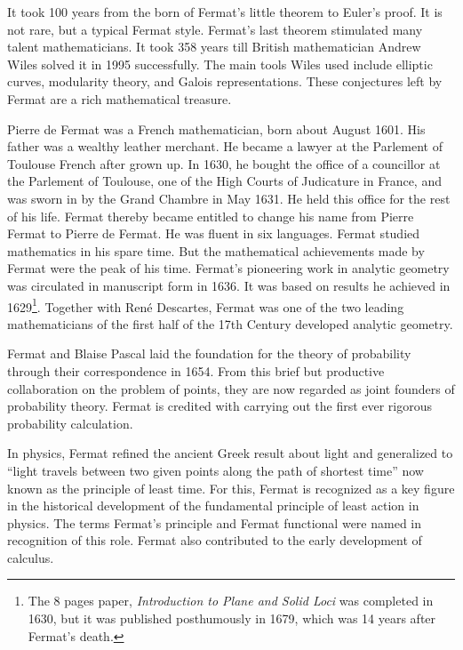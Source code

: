\documentclass[b5paper]{article}
\begin{document}
It took 100 years from the born of Fermat's little theorem to Euler's proof. It is not rare, but a typical Fermat style. Fermat's last theorem stimulated many talent mathematicians. It took 358 years till British mathematician Andrew Wiles solved it in 1995 successfully. The main tools Wiles used include elliptic curves, modularity theory, and Galois representations\cite{HanXueTao2009}. These conjectures left by Fermat are a rich mathematical treasure.

\vspace{5mm}


Pierre de Fermat was a French mathematician, born about August 1601. His father was a wealthy leather merchant. He became a lawyer at the Parlement of Toulouse French after grown up. In 1630, he bought the office of a councillor at the Parlement of Toulouse, one of the High Courts of Judicature in France, and was sworn in by the Grand Chambre in May 1631. He held this office for the rest of his life. Fermat thereby became entitled to change his name from Pierre Fermat to Pierre de Fermat. He was fluent in six languages. Fermat studied mathematics in his spare time. But the mathematical achievements made by Fermat were the peak of his time. Fermat's pioneering work in analytic geometry was circulated in manuscript form in 1636. It was based on results he achieved in 1629\footnote{The 8 pages paper, {\em Introduction to Plane and Solid Loci} was completed in 1630, but it was published posthumously in 1679, which was 14 years after Fermat's death.}. Together with René Descartes, Fermat was one of the two leading mathematicians of the first half of the 17th Century developed analytic geometry.

Fermat and Blaise Pascal laid the foundation for the theory of probability through their correspondence in 1654. From this brief but productive collaboration on the problem of points, they are now regarded as joint founders of probability theory. Fermat is credited with carrying out the first ever rigorous probability calculation.

In physics, Fermat refined the ancient Greek result about light and generalized to ``light travels between two given points along the path of shortest time'' now known as the principle of least time. For this, Fermat is recognized as a key figure in the historical development of the fundamental principle of least action in physics. The terms Fermat's principle and Fermat functional were named in recognition of this role. Fermat also contributed to the early development of calculus.
\end{document}
